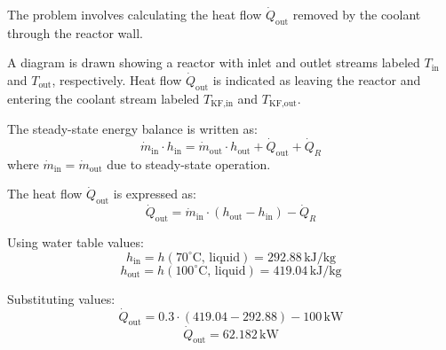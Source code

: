 The problem involves calculating the heat flow \( \dot{Q}_{\text{out}} \) removed by the coolant through the reactor wall.  

A diagram is drawn showing a reactor with inlet and outlet streams labeled \( T_{\text{in}} \) and \( T_{\text{out}} \), respectively. Heat flow \( \dot{Q}_{\text{out}} \) is indicated as leaving the reactor and entering the coolant stream labeled \( T_{\text{KF,in}} \) and \( T_{\text{KF,out}} \).  

The steady-state energy balance is written as:  
\[
\dot{m}_{\text{in}} \cdot h_{\text{in}} = \dot{m}_{\text{out}} \cdot h_{\text{out}} + \dot{Q}_{\text{out}} + \dot{Q}_R
\]  
where \( \dot{m}_{\text{in}} = \dot{m}_{\text{out}} \) due to steady-state operation.  

The heat flow \( \dot{Q}_{\text{out}} \) is expressed as:  
\[
\dot{Q}_{\text{out}} = \dot{m}_{\text{in}} \cdot (h_{\text{out}} - h_{\text{in}}) - \dot{Q}_R
\]  

Using water table values:  
\[
h_{\text{in}} = h(70^\circ\text{C, liquid}) = 292.88 \, \text{kJ/kg}
\]  
\[
h_{\text{out}} = h(100^\circ\text{C, liquid}) = 419.04 \, \text{kJ/kg}
\]  

Substituting values:  
\[
\dot{Q}_{\text{out}} = 0.3 \cdot (419.04 - 292.88) - 100 \, \text{kW}
\]  
\[
\dot{Q}_{\text{out}} = 62.182 \, \text{kW}
\]